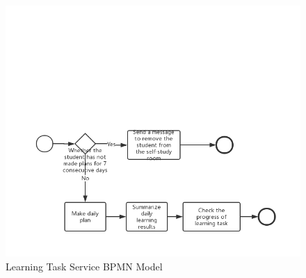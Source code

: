 \documentclass[runningheads]{llncs}
\begin{document}
	\begin{figure}
		\centering %
		\includegraphics[width=1.0\textwidth]{figure/llt/learningtaskservice} %
		\caption{Learning Task Service BPMN Model} %
		\label{Learning Task} %
	\end{figure}
\end{document}
